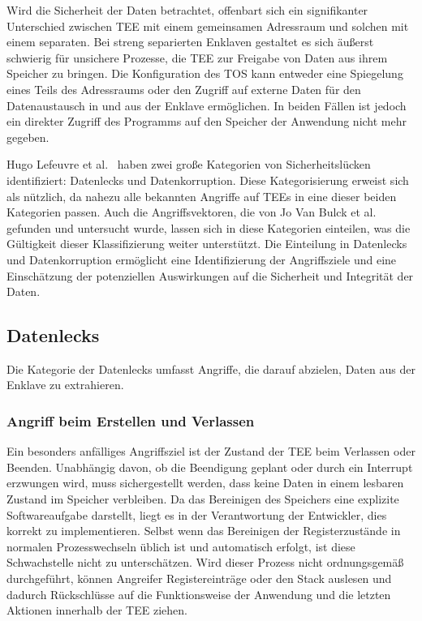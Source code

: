 Wird die Sicherheit der Daten betrachtet, offenbart sich ein signifikanter Unterschied zwischen TEE mit einem gemeinsamen Adressraum und solchen mit einem separaten. 
Bei streng separierten Enklaven gestaltet es sich äußerst schwierig für unsichere Prozesse, die TEE zur Freigabe von Daten aus ihrem Speicher zu bringen.
Die Konfiguration des TOS kann entweder eine Spiegelung eines Teils des Adressraums oder den Zugriff auf externe Daten für den Datenaustausch in und aus der Enklave ermöglichen. 
In beiden Fällen ist jedoch ein direkter Zugriff des Programms auf den Speicher der Anwendung nicht mehr gegeben.

Hugo Lefeuvre et al.~\cite{CIVPaper} haben zwei große Kategorien von Sicherheitslücken identifiziert: Datenlecks und Datenkorruption. Diese Kategorisierung erweist sich als nützlich, da nahezu alle bekannten Angriffe auf TEEs in eine dieser beiden Kategorien passen. Auch die Angriffsvektoren, die von Jo Van Bulck et al.\cite{TEEPaper} gefunden und untersucht wurde, lassen sich in diese Kategorien einteilen, was die Gültigkeit dieser Klassifizierung weiter unterstützt. Die Einteilung in Datenlecks und Datenkorruption ermöglicht eine Identifizierung der Angriffsziele und eine Einschätzung der potenziellen Auswirkungen auf die Sicherheit und Integrität der Daten.

\subsection{Datenlecks}
Die Kategorie der Datenlecks umfasst Angriffe, die darauf abzielen, Daten aus der Enklave zu extrahieren. 

\subsubsection{Angriff beim Erstellen und Verlassen}
Ein besonders anfälliges Angriffsziel ist der Zustand der TEE beim Verlassen oder Beenden. Unabhängig davon, ob die Beendigung geplant oder durch ein Interrupt erzwungen wird, muss sichergestellt werden, dass keine Daten in einem lesbaren Zustand im Speicher verbleiben. Da das Bereinigen des Speichers eine explizite Softwareaufgabe darstellt, liegt es in der Verantwortung der Entwickler, dies korrekt zu implementieren. Selbst wenn das Bereinigen der Registerzustände in normalen Prozesswechseln üblich ist und automatisch erfolgt, ist diese Schwachstelle nicht zu unterschätzen. Wird dieser Prozess nicht ordnungsgemäß durchgeführt, können Angreifer Registereinträge oder den Stack auslesen und dadurch Rückschlüsse auf die Funktionsweise der Anwendung und die letzten Aktionen innerhalb der TEE ziehen.

